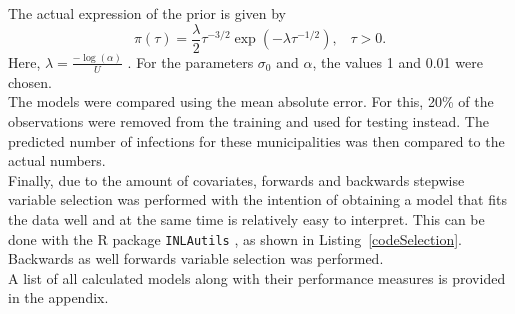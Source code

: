 The actual expression of the prior is given by
\begin{equation}
    \pi\left(\tau\right)=\frac{\lambda}{2}\tau^{-3/2}\exp\left(-\lambda\tau^{-1/2}\right),\hspace{10pt}\tau>0.
\end{equation}
Here, $\lambda=\frac{-\log\left(\alpha\right)}{U}$ \cite{simpson2017penalising}.
For the parameters $\sigma_0$ and $\alpha$, the values 1 and 0.01 were chosen. \\
The models were compared using the mean absolute error. For this, 20\% of the observations were removed from the training and used for testing instead. The predicted number of infections for these municipalities was then compared to the actual numbers.
\\
Finally, due to the amount of covariates, forwards and backwards stepwise variable selection was performed with the intention of obtaining a model that fits the data well and at the same time is relatively easy to interpret. This can be done with the R package \texttt{INLAutils} \cite{inlautils}, as shown in Listing~\ref{codeSelection}. Backwards as well forwards variable selection was performed.\\
A list of all calculated models along with their performance measures is provided in the appendix.
